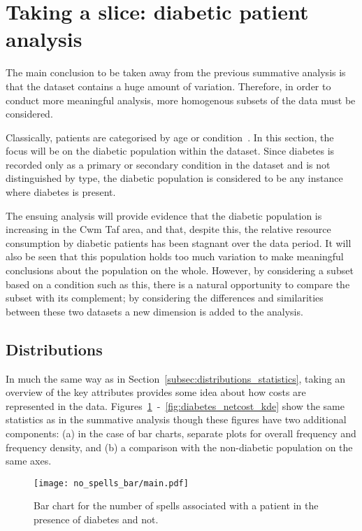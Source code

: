 \section{Taking a slice: diabetic patient analysis}\label{sec:diabetes}

The main conclusion to be taken away from the previous summative analysis is
that the dataset contains a huge amount of variation. Therefore, in order to
conduct more meaningful analysis, more homogenous subsets of the data must be
considered.

Classically, patients are categorised by age or condition~\cite{Vuik2016}. In
this section, the focus will be on the diabetic population within the dataset.
Since diabetes is recorded only as a primary or secondary condition in the
dataset and is not distinguished by type, the diabetic population is considered
to be any instance where diabetes is present.

The ensuing analysis will provide evidence that the diabetic population is
increasing in the Cwm Taf area, and that, despite this, the relative resource
consumption by diabetic patients has been stagnant over the data period. It will
also be seen that this population holds too much variation to make meaningful 
conclusions about the population on the whole. However, by considering a subset
based on a condition such as this, there is a natural opportunity to compare
the subset with its complement; by considering the differences and similarities
between these two datasets a new dimension is added to the analysis.


\subsection{Distributions}\label{subsec:diabetes_dists}

In much the same way as in Section~\ref{subsec:distributions_statistics}, taking
an overview of the key attributes provides some idea about how costs are
represented in the data.
Figures~\ref{fig:diabetes_no_spells_bar}~\--~\ref{fig:diabetes_netcost_kde} show
the same statistics as in the summative analysis though these figures have two
additional components: (a) in the case of bar charts, separate plots for overall
frequency and frequency density, and (b) a comparison with the non-diabetic
population on the same axes.

\begin{figure}[htbp]
    \centering
    \texttt{[image: no\_spells\_bar/main.pdf]}
    \caption{Bar chart for the number of spells associated with a patient in the
        presence of diabetes and not.}%
    \label{fig:diabetes_no_spells_bar}
\end{figure}

